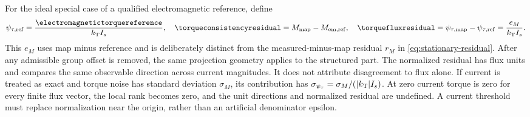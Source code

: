 For the ideal special case of a qualified electromagnetic reference, define
\begin{equation}
 \psi_{\tau,\rm ref}=\frac{\electromagnetictorquereference}{k_{\rm T}I_s},
 \quad \torqueconsistencyresidual=M_{\rm map}-M_{\rm em,ref},
 \quad \torquefluxresidual=\psi_{\tau,\rm map}-\psi_{\tau,\rm ref}
                         =\frac{e_M}{k_{\rm T}I_s}.
 \label{eq:torque-residual}
\end{equation}
This $e_M$ uses map minus reference and is deliberately distinct from the
measured-minus-map residual $r_M$ in \cref{eq:stationary-residual}. After any
admissible group offset is removed, the same projection geometry applies to
the structured part. The normalized residual has flux units and compares the same observable
direction across current magnitudes. It does not attribute disagreement
to flux alone. If current is treated as exact and torque noise has standard
deviation $\sigma_M$, its contribution has
$\sigma_{\psi_\tau}=\sigma_M/(|k_{\rm T}|I_s)$. At zero current torque is
zero for every finite flux vector, the local rank becomes zero, and the
unit directions and normalized residual are undefined. A current threshold
must replace normalization near the origin, rather than an artificial
denominator epsilon.

